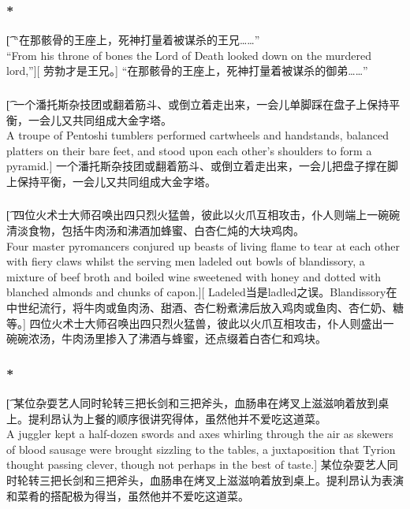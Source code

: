 \documentclass[12pt,a4paper]{article}
\begin{document}
\subsubsection{\color{red}*}\t[
“在那骸骨的王座上，死神打量着被谋杀的王兄……”\\
“From his throne of bones the Lord of Death looked down on the murdered lord,”][
劳勃才是王兄。]
“在那骸骨的王座上，死神打量着被谋杀的御弟……”

\subsubsection{}\t[
一个潘托斯杂技团或翻着筋斗、或倒立着走出来，一会儿单脚踩在盘子上保持平衡，一会儿又共同组成大金字塔。\\
A troupe of Pentoshi tumblers performed cartwheels and handstands, balanced platters on their bare feet, and stood upon each other's shoulders to form a pyramid.]
一个潘托斯杂技团或翻着筋斗、或倒立着走出来，一会儿把盘子撑在脚上保持平衡，一会儿又共同组成大金字塔。

\subsubsection{}\t[
	四位火术士大师召唤出四只烈火猛兽，彼此以火爪互相攻击，仆人则端上一碗碗清淡食物，包括牛肉汤和沸酒加蜂蜜、白杏仁炖的大块鸡肉。\\
	Four master pyromancers conjured up beasts of living flame to tear at each other with fiery claws whilst the serving men ladeled out bowls of blandissory, a mixture of beef broth and boiled wine sweetened with honey and dotted with blanched almonds and chunks of capon.][
	Ladeled当是ladled之误。Blandissory在中世纪流行，将牛肉或鱼肉汤、甜酒、杏仁粉煮沸后放入鸡肉或鱼肉、杏仁奶、糖等。]
	四位火术士大师召唤出四只烈火猛兽，彼此以火爪互相攻击，仆人则盛出一碗碗浓汤，牛肉汤里掺入了沸酒与蜂蜜，还点缀着白杏仁和鸡块。
	
\subsubsection{\color{red}*}\t[
某位杂耍艺人同时轮转三把长剑和三把斧头，血肠串在烤叉上滋滋响着放到桌上。提利昂认为上餐的顺序很讲究得体，虽然他并不爱吃这道菜。\\
A juggler kept a half-dozen swords and axes whirling through the air as skewers of blood sausage were brought sizzling to the tables, a juxtaposition that Tyrion thought passing clever, though not perhaps in the best of taste.]
某位杂耍艺人同时轮转三把长剑和三把斧头，血肠串在烤叉上滋滋响着放到桌上。提利昂认为表演和菜肴的搭配极为得当，虽然他并不爱吃这道菜。
\end{document}
